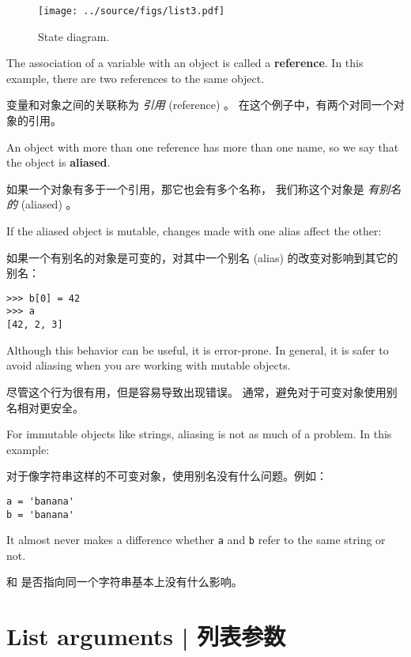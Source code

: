   


\begin{figure}
\centerline
{\texttt{[image: ../source/figs/list3.pdf]}}
\caption{State diagram.}
\label{fig.list3}
\end{figure}

The association of a variable with an object is called a {\bf
reference}.  In this example, there are two references to the same
object.

变量和对象之间的关联称为 {\em 引用} (reference) 。
在这个例子中，有两个对同一个对象的引用。


An object with more than one reference has more
than one name, so we say that the object is {\bf aliased}.

如果一个对象有多于一个引用，那它也会有多个名称，
我们称这个对象是 {\em 有别名的} (aliased) 。


If the aliased object is mutable, changes made with one alias affect
the other:

如果一个有别名的对象是可变的，对其中一个别名 (alias) 的改变对影响到其它的别名：

\begin{lstlisting}
>>> b[0] = 42
>>> a
[42, 2, 3]
\end{lstlisting}

%
Although this behavior can be useful, it is error-prone.  In general,
it is safer to avoid aliasing when you are working with mutable
objects.

尽管这个行为很有用，但是容易导致出现错误。
通常，避免对于可变对象使用别名相对更安全。


For immutable objects like strings, aliasing is not as much of a
problem.  In this example:

对于像字符串这样的不可变对象，使用别名没有什么问题。例如：

\begin{lstlisting}
a = 'banana'
b = 'banana'
\end{lstlisting}

%
It almost never makes a difference whether {\tt a} and {\tt b} refer
to the same string or not.

 和  是否指向同一个字符串基本上没有什么影响。


\section{List arguments  |  列表参数}
\label{list.arguments}
  
  


